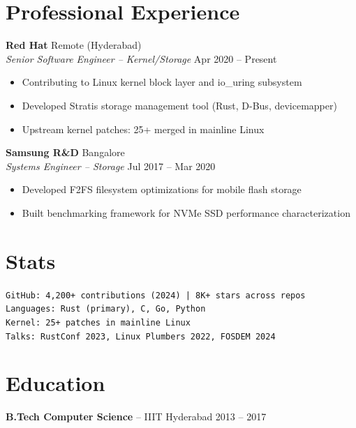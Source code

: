 \documentclass[10pt,letterpaper]{article}
\begin{document}
\section{Professional Experience}

\textbf{Red Hat} \hfill Remote (Hyderabad)\\
\textit{Senior Software Engineer -- Kernel/Storage} \hfill Apr 2020 -- Present
\begin{itemize}
\item Contributing to Linux kernel block layer and io\_uring subsystem
\item Developed Stratis storage management tool (Rust, D-Bus, devicemapper)
\item Upstream kernel patches: 25+ merged in mainline Linux
\end{itemize}

\textbf{Samsung R\&D} \hfill Bangalore\\
\textit{Systems Engineer -- Storage} \hfill Jul 2017 -- Mar 2020
\begin{itemize}
\item Developed F2FS filesystem optimizations for mobile flash storage
\item Built benchmarking framework for NVMe SSD performance characterization
\end{itemize}

\section{Stats}

\begin{tcolorbox}
\texttt{GitHub: 4,200+ contributions (2024) | 8K+ stars across repos}\\
\texttt{Languages: Rust (primary), C, Go, Python}\\
\texttt{Kernel: 25+ patches in mainline Linux}\\
\texttt{Talks: RustConf 2023, Linux Plumbers 2022, FOSDEM 2024}
\end{tcolorbox}

\section{Education}
\textbf{B.Tech Computer Science} -- IIIT Hyderabad \hfill 2013 -- 2017
\end{document}
